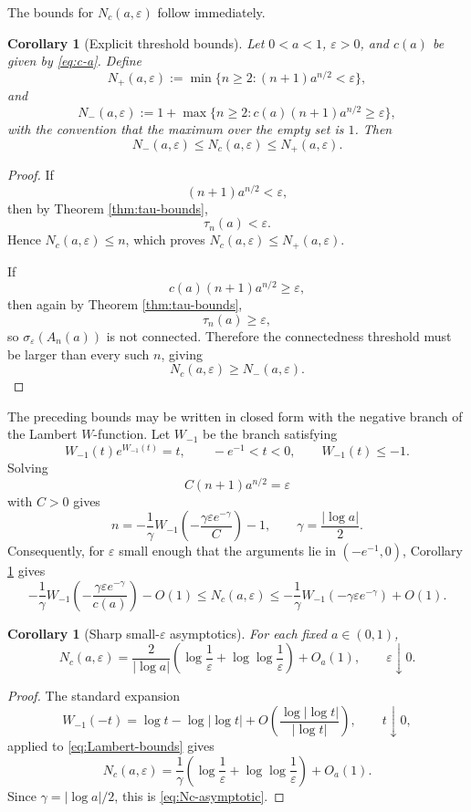 \documentclass[11pt]{amsart}
\numberwithin{equation}{section}
\newcommand{\eps}{\varepsilon}
\newcommand{\A}{A}
\newtheorem{corollary}[theorem]{Corollary}
\begin{document}
The bounds for \(N_c(a,\eps)\) follow immediately.

\begin{corollary}[Explicit threshold bounds]\label{cor:Nc-bounds}
Let \(0<a<1\), \(\eps>0\), and \(c(a)\) be given by \eqref{eq:c-a}.  Define
\[
N_+(a,\eps)
:=
\min\{n\ge2:(n+1)a^{n/2}<\eps\},
\tag{6.9}\label{eq:Nplus}
\]
and
\[
N_-(a,\eps)
:=
1+\max\{n\ge2:c(a)(n+1)a^{n/2}\ge\eps\},
\tag{6.10}\label{eq:Nminus}
\]
with the convention that the maximum over the empty set is \(1\).  Then
\[
N_-(a,\eps)\le N_c(a,\eps)\le N_+(a,\eps).
\tag{6.11}\label{eq:N-two-sided}
\]
\end{corollary}

\begin{proof}
If
\[
(n+1)a^{n/2}<\eps,
\]
then by Theorem \ref{thm:tau-bounds},
\[
\tau_n(a)<\eps.
\]
Hence \(N_c(a,\eps)\le n\), which proves \(N_c(a,\eps)\le N_+(a,\eps)\).

If
\[
c(a)(n+1)a^{n/2}\ge\eps,
\]
then again by Theorem \ref{thm:tau-bounds},
\[
\tau_n(a)\ge\eps,
\]
so \(\sigma_\eps(\A_n(a))\) is not connected.  Therefore the connectedness threshold must be larger than every such \(n\), giving
\[
N_c(a,\eps)\ge N_-(a,\eps).
\]
\end{proof}

The preceding bounds may be written in closed form with the negative branch of the Lambert \(W\)-function.  Let \(W_{-1}\) be the branch satisfying
\[
W_{-1}(t)e^{W_{-1}(t)}=t,\qquad -e^{-1}<t<0,\qquad W_{-1}(t)\le -1.
\]
Solving
\[
C(n+1)a^{n/2}=\eps
\]
with \(C>0\) gives
\[
n
=
-\frac1\gamma
W_{-1}\!\left(-\frac{\gamma\eps e^{-\gamma}}{C}\right)-1,
\qquad
\gamma=\frac{|\log a|}{2}.
\tag{6.12}\label{eq:Lambert-root}
\]
Consequently, for \(\eps\) small enough that the arguments lie in \((-e^{-1},0)\), Corollary \ref{cor:Nc-bounds} gives
\[
-\frac1\gamma
W_{-1}\!\left(-\frac{\gamma\eps e^{-\gamma}}{c(a)}\right)-O(1)
\le
N_c(a,\eps)
\le
-\frac1\gamma
W_{-1}\!\left(-\gamma\eps e^{-\gamma}\right)+O(1).
\tag{6.13}\label{eq:Lambert-bounds}
\]

\begin{corollary}[Sharp small-\(\eps\) asymptotics]\label{cor:Nc-asymptotic}
For each fixed \(a\in(0,1)\),
\[
N_c(a,\eps)
=
\frac{2}{|\log a|}
\left(
\log\frac1\eps+\log\log\frac1\eps
\right)
+O_a(1),
\qquad \eps\downarrow0.
\tag{6.14}\label{eq:Nc-asymptotic}
\]
\end{corollary}

\begin{proof}
The standard expansion
\[
W_{-1}(-t)
=
\log t-\log|\log t|+O\!\left(\frac{\log|\log t|}{|\log t|}\right),
\qquad t\downarrow0,
\]
applied to \eqref{eq:Lambert-bounds} gives
\[
N_c(a,\eps)
=
\frac1\gamma
\left(
\log\frac1\eps+\log\log\frac1\eps
\right)
+O_a(1).
\]
Since \(\gamma=|\log a|/2\), this is \eqref{eq:Nc-asymptotic}.
\end{proof}
\end{document}
